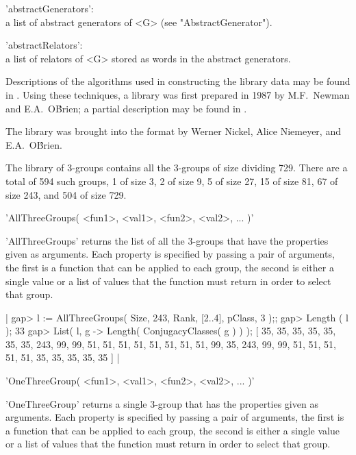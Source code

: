 'abstractGenerators': \\
        a list of abstract generators of <G> (see "AbstractGenerator").

'abstractRelators': \\
        a  list of  relators  of <G>  stored  as  words in  the  abstract
        generators.

Descriptions of the algorithms used in constructing  the library data may
be found in \cite{OBr90,OBr91}.  Using  these techniques,  a library  was
first  prepared  in  1987 by  M.F.~Newman  and  E.A.~O\'Brien; a  partial
description may be found in \cite{NO89}.

The  library was brought into  the {\GAP} format by Werner Nickel,  Alice
Niemeyer, and E.A.~O\'Brien.

\newpage
{}%

The  library  of 3-groups contains all the 3-groups of size dividing 729.
There  are  a total of 594 such groups, 1  of size 3,  2 of size 9,  5 of
size 27,  15 of size 81,   67 of size 243, and  504 of size 729.

\vspace{5mm}
'AllThreeGroups( <fun1>, <val1>, <fun2>, <val2>, ... )'%

'AllThreeGroups'  returns the  list  of  all the 3-groups that  have  the
properties given as arguments.  Each  property  is specified by passing a
pair of arguments,  the first  is  a function that can be applied to each
group, the second is either a  single value or  a list of values that the
function must return in order to select that group.

|    gap> l := AllThreeGroups( Size, 243, Rank, [2..4], pClass, 3 );;
    gap> Length ( l );
    33
    gap>  List( l, g -> Length( ConjugacyClasses( g ) ) );
    [ 35, 35, 35, 35, 35, 35, 35, 243, 99, 99, 51, 51, 51, 51, 51, 51,
      51, 51, 99, 35, 243, 99, 99, 51, 51, 51, 51, 51, 35, 35, 35, 35, 35
     ] |

\vspace{5mm}
'OneThreeGroup( <fun1>, <val1>, <fun2>, <val2>, ... )'%

'OneThreeGroup' returns a single 3-group that has the properties given as
arguments.   Each property is  specified by passing a pair of  arguments,
the first is a function that can  be applied to each group, the second is
either a single value or a list  of values that the function  must return
in order to select that group.

